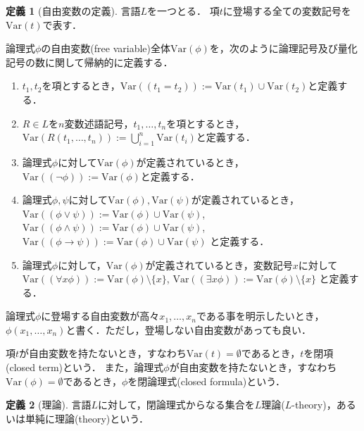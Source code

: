 \documentclass[uplatex, dvipdfmx]{jsarticle}
\newcommand{\Var}{\mathrm{Var}}
\theoremstyle{definition}
\newtheorem{definition}{定義}[section]
\begin{document}
\begin{definition}[自由変数の定義]
     言語$L$を一つとる．
     項$t$に登場する全ての変数記号を$\Var(t)$で表す．

     論理式$\phi$の自由変数(free variable)全体$\Var(\phi)$を，次のように論理記号及び量化記号の数に関して帰納的に定義する．
     \begin{enumerate}
          \item $t_1, t_2$を項とするとき，$\Var((t_1=t_2)):=\Var(t_1)\cup\Var(t_2)$と定義する．
          \item $R \in L$を$n$変数述語記号，$t_1, \dots, t_n$を項とするとき，$\Var(R(t_1, \dots, t_n)):= \bigcup_{i=1}^n \Var(t_i)$と定義する．
          \item 論理式$\phi$に対して$\Var(\phi)$が定義されているとき，$\Var((\lnot \phi)):=\Var(\phi)$と定義する．
          \item 論理式$\phi, \psi$に対して$\Var(\phi), \Var(\psi)$が定義されているとき，
          $\Var((\phi \lor \psi)):=\Var(\phi)\cup\Var(\psi)$,
          $\Var((\phi \land \psi)):=\Var(\phi)\cup\Var(\psi)$,
          $\Var((\phi \rightarrow \psi)):=\Var(\phi)\cup\Var(\psi)$
          と定義する．
          \item 論理式$\phi$に対して，$\Var(\phi)$が定義されているとき，変数記号$x$に対して
          $\Var((\forall x\phi)):=\Var(\phi) \setminus \{x\}$,
          $\Var((\exists x\phi)):=\Var(\phi) \setminus \{x\}$
          と定義する．
     \end{enumerate}

     論理式$\phi$に登場する自由変数が高々$x_1, \dots, x_n$である事を明示したいとき，$\phi(x_1, \dots, x_n)$と書く．ただし，登場しない自由変数があっても良い．

     項$t$が自由変数を持たないとき，すなわち$\Var(t)=\emptyset$であるとき，$t$を閉項(closed term)という．
     また，論理式$\phi$が自由変数を持たないとき，すなわち$\Var(\phi)=\emptyset$であるとき，$\phi$を閉論理式(closed formula)という．
\end{definition}

\begin{definition}[理論]
     言語$L$に対して，閉論理式からなる集合を$L$理論($L$-theory)，あるいは単純に理論(theory)という．
\end{definition}
\end{document}
